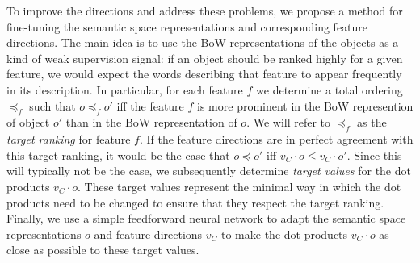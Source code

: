 To improve the directions and address these problems, we propose a method for fine-tuning the semantic space representations and corresponding feature directions. The main  idea is to use the BoW representations of the objects as a kind of weak supervision signal: if an object should be ranked highly for a given feature, we would expect the words describing that feature to appear frequently in its description.
In particular, for each feature $f$ we determine a total ordering $\preccurlyeq_f$ such that $o \preccurlyeq_f o'$ iff the feature $f$ is more prominent in the BoW represention of object $o'$ than in the BoW representation of $o$. We will refer to $\preccurlyeq_f$ as the \emph{target ranking} for feature $f$. If the feature directions are in perfect agreement with this target ranking, it would be the case that $o \preccurlyeq o'$ iff  $v_C \cdot o \leq v_C \cdot o'$. Since this will typically not be the case, we subsequently determine \emph{target values} for the dot products $v_C \cdot o$. These target values represent the minimal way in which the dot products need to be changed to ensure that they respect the target ranking.
Finally, we use a simple feedforward neural network to adapt the semantic space representations $o$ and feature directions $v_C$ to make the dot products $v_C \cdot o$ as close as possible to these target values. 

